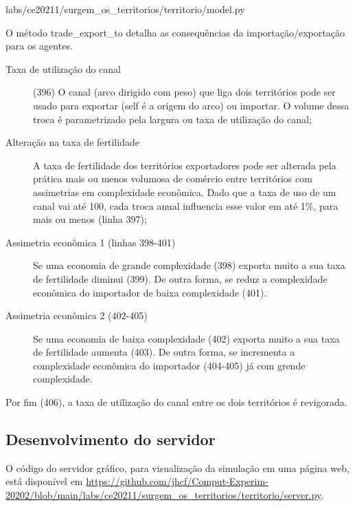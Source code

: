 
{labs/ce20211/surgem_os_territorios/territorio/model.py}

O método trade\_export\_to detalha as consequências da importação/exportação para os agentes.
\begin{description}
\item [Taxa de utilização do canal] (396) O canal (arco dirigido com peso) que liga dois territórios pode ser usado para exportar (self é a origem do arco) ou importar. O volume dessa troca é parametrizado pela largura ou taxa de utilização do canal;
\item [Alteração na taxa de fertilidade] A taxa de fertilidade dos territórios exportadores pode ser alterada pela prática mais ou menos volumosa de  comércio entre territórios com assimetrias em complexidade econômica. Dado que a taxa de uso de um canal vai até 100, cada troca anual influencia esse valor em até 1\%, para mais ou menos (linha 397);
\item [Assimetria econômica 1 (linhas 398-401)] Se uma economia de grande complexidade (398) exporta muito a sua taxa de fertilidade diminui (399). De outra forma, se reduz a complexidade econômica do importador de baixa complexidade (401).
\item [Assimetria econômica 2 (402-405)] Se uma economia de baixa complexidade (402) exporta muito a sua taxa de fertilidade aumenta (403). De outra forma, se incrementa a complexidade econômica do importador (404-405) já com grende complexidade.
\end{description}


Por fim (406), a taxa de utilização do canal entre os dois territórios é revigorada.
 
\subsection{Desenvolvimento do servidor}

O código do servidor gráfico, para visualização da simulação em uma página web, está disponível em \url{https://github.com/jhcf/Comput-Experim-20202/blob/main/labs/ce20211/surgem_os_territorios/territorio/server.py}.

